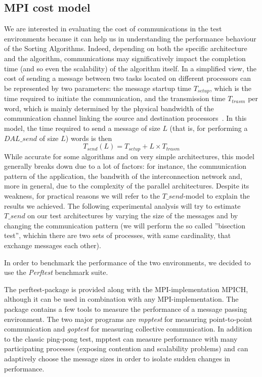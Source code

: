 \subsection{MPI cost model}
\label{MPI-cost-model}
We are interested in evaluating the cost of communications in the test environments because it can help us in understanding the performance behaviour of the Sorting Algorithms. Indeed, depending on both the specific architecture and the algorithm, communications may significatively impact the completion time (and so even the scalability) of the algorithm itself. In a simplified view, the cost of sending a message between two tasks located on different processors can be represented by two parameters: the message startup time $T_{setup}$, which is the time required to initiate the communication, and the transmission time $T_{trasm}$ per word, which is mainly determined by the physical bandwidth of the communication channel linking the source and destination processors~\cite{VANN}. In this model, the time required to send a message of size $L$ (that is, for performing a $DAL\_send$ of size $L$) words is then
\[
T_{send}(L) = T_{setup} + L \times T_{trasm}
\]
While accurate for some algorithms and on very simple architectures, this model generally breaks down due to a lot of factors: for instance, the communication pattern of the application, the bandwith of the interconnection network and, more in general, due to the complexity of the parallel architectures. Despite its weakness, for practical reasons we will refer to the $T\_send$-model to explain the results we achieved.  
The following experimental analysis will try to estimate $T\_send$ on our test architectures by varying the size of the messages and by changing the communication pattern (we will perform the so called ''bisection test'', whichin there are two sets of processes, with same cardinality, that exchange messages each other). 

In order to benchmark the performance of the two environments, we decided to use the \textit{Perftest} benchmark suite.

The perftest-package is provided along with the MPI-implementation MPICH, although it can be used in combination with any MPI-implementation. The package contains a few tools to measure the performance of a message passing environment. The two major programs are \textit{mpptest} for measuring point-to-point communication and \textit{goptest} for measuring collective communication. In addition to the classic ping-pong test, mpptest can measure performance with many participating processes (exposing contention and scalability problems) and can adaptively choose the message sizes in order to isolate sudden changes in performance. 

